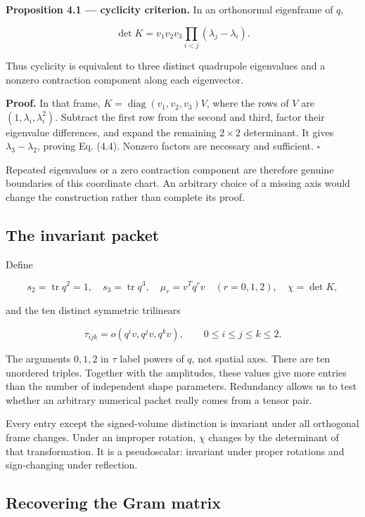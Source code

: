 \documentclass[
  11pt,
  a4paper]{article}
\begin{document}
\textbf{Proposition 4.1 --- cyclicity criterion.} In an orthonormal eigenframe of \(q\),

\[
\det K=v_1v_2v_3\prod_{i<j}(\lambda_j-\lambda_i).
\tag{4.4}
\]

Thus cyclicity is equivalent to three distinct quadrupole eigenvalues and a nonzero contraction component along each eigenvector.

\textbf{Proof.} In that frame,
\(K=\operatorname{diag}(v_1,v_2,v_3)V\), where the rows of \(V\) are \((1,\lambda_i,\lambda_i^2)\). Subtract the first row from the second and third, factor their eigenvalue differences, and expand the remaining \(2\times2\) determinant. It gives \(\lambda_3-\lambda_2\), proving Eq. (4.4). Nonzero factors are necessary and sufficient. \(\square\)

Repeated eigenvalues or a zero contraction component are therefore genuine boundaries of this coordinate chart. An arbitrary choice of a missing axis would change the construction rather than complete its proof.

\hypertarget{the-invariant-packet}{%
\subsection{The invariant packet}\label{the-invariant-packet}}

Define

\[
s_2=\operatorname{tr}q^2=1,\quad s_3=\operatorname{tr}q^3,\quad
\mu_r=v^Tq^rv\quad(r=0,1,2),\quad\chi=\det K,
\tag{4.5}
\]

and the ten distinct symmetric trilinears

\[
\tau_{ijk}=o(q^iv,q^jv,q^kv),\qquad0\le i\le j\le k\le2.
\tag{4.6}
\]

The arguments \(0,1,2\) in \(\tau\) label powers of \(q\), not spatial axes. There are ten unordered triples. Together with the amplitudes, these values give more entries than the number of independent shape parameters. Redundancy allows us to test whether an arbitrary numerical packet really comes from a tensor pair.

Every entry except the signed-volume distinction is invariant under all orthogonal frame changes. Under an improper rotation, \(\chi\) changes by the determinant of that transformation. It is a pseudoscalar: invariant under proper rotations and sign-changing under reflection.

\hypertarget{recovering-the-gram-matrix}{%
\subsection{Recovering the Gram matrix}\label{recovering-the-gram-matrix}}
\end{document}
